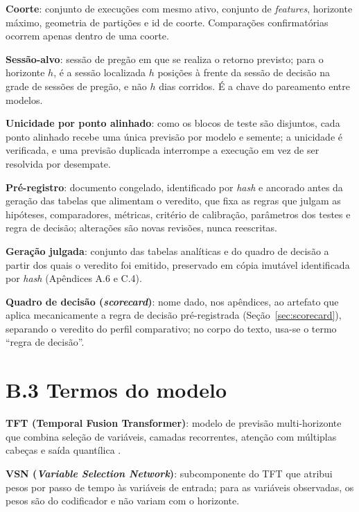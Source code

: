 \label{gl:coorte}\textbf{Coorte}: conjunto de execuções com mesmo ativo, conjunto de \textit{features}, horizonte máximo, geometria de partições e id de coorte. Comparações confirmatórias ocorrem apenas dentro de uma coorte.

\label{gl:sessao-alvo}\textbf{Sessão-alvo}: sessão de pregão em que se realiza o retorno previsto; para o horizonte \(h\), é a sessão localizada \(h\) posições à frente da sessão de decisão na grade de sessões de pregão, e não \(h\) dias corridos. É a chave do pareamento entre modelos.

\label{gl:dedup}\textbf{Unicidade por ponto alinhado}: como os blocos de teste são disjuntos, cada ponto alinhado recebe uma única previsão por modelo e semente; a unicidade é verificada, e uma previsão duplicada interrompe a execução em vez de ser resolvida por desempate.

\label{gl:preregistro}\textbf{Pré-registro}: documento congelado, identificado por \textit{hash} e ancorado antes da geração das tabelas que alimentam o veredito, que fixa as regras que julgam as hipóteses, comparadores, métricas, critério de calibração, parâmetros dos testes e regra de decisão; alterações são novas revisões, nunca reescritas.

\label{gl:geracao}\textbf{Geração julgada}: conjunto das tabelas analíticas e do quadro de decisão a partir dos quais o veredito foi emitido, preservado em cópia imutável identificada por \textit{hash} (Apêndices A.6 e C.4).

\label{gl:scorecard}\textbf{Quadro de decisão (\textit{scorecard})}: nome dado, nos apêndices, ao artefato que aplica mecanicamente a regra de decisão pré-registrada (Seção~\ref{sec:scorecard}), separando o veredito do perfil comparativo; no corpo do texto, usa-se o termo ``regra de decisão''.

\section*{B.3 Termos do modelo}

\label{gl:tft}\textbf{TFT (Temporal Fusion Transformer)}: modelo de previsão multi-horizonte que combina seleção de variáveis, camadas recorrentes, atenção com múltiplas cabeças e saída quantílica \cite{LIMETAL2021TFT}.

\label{gl:vsn}\textbf{VSN (\textit{Variable Selection Network})}: subcomponente do TFT que atribui pesos por passo de tempo às variáveis de entrada; para as variáveis observadas, os pesos são do codificador e não variam com o horizonte.

